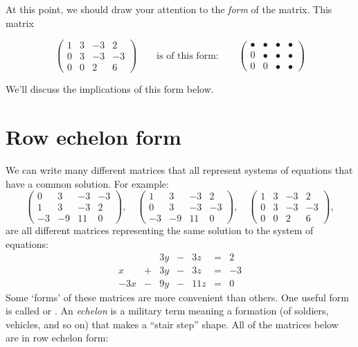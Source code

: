 \documentclass{ximera}
\begin{document}
At this point, we should draw your attention to the \emph{form} of the matrix. This matrix

\[
\begin{pmatrix}
  1 &   3 & -3 & 2  \\
  0 &   3 & -3 & -3 \\
  0& 0  & 2 & 6
\end{pmatrix}
\qquad
\text{is of this form:}
\qquad
\begin{pmatrix}
  \bullet & \bullet & \bullet & \bullet \\
     0   & \bullet & \bullet & \bullet \\
     0  &    0 & \bullet & \bullet
\end{pmatrix}
\]



We'll discuss the implications of this form below.


\section{Row echelon form}

We can write many different matrices that all represent systems
of equations that have a common solution. For example:
\[
\begin{pmatrix}
 0 &   3 & -3 & -3 \\
  1 &   3 & -3 & 2  \\
  -3& -9  & 11 & 0
\end{pmatrix},
\quad
\begin{pmatrix}
  1 &   3 & -3 & 2  \\
  0 &   3 & -3 & -3 \\
  -3& -9  & 11 & 0
\end{pmatrix},
\quad
\begin{pmatrix}
  1 &   3 & -3 & 2  \\
  0 &   3 & -3 & -3 \\
  0& 0  & 2 & 6
\end{pmatrix},
\]
are all different matrices representing the same solution to the
system of equations:
\[
\begin{array}{ccccccc}
       & & 3y &-& 3z &=& 2 \\
     x& +&3y&-&3z&=&-3\\
     -3x& -&9y&-&11z&=&0
\end{array}
\]
Some `forms' of these matrices are more convenient than others. One
useful form is called  or . An \textit{echelon} is a military term meaning a formation
(of soldiers, vehicles, and so on) that makes a ``stair step''
shape. All of the matrices below are in row echelon form:
\end{document}
